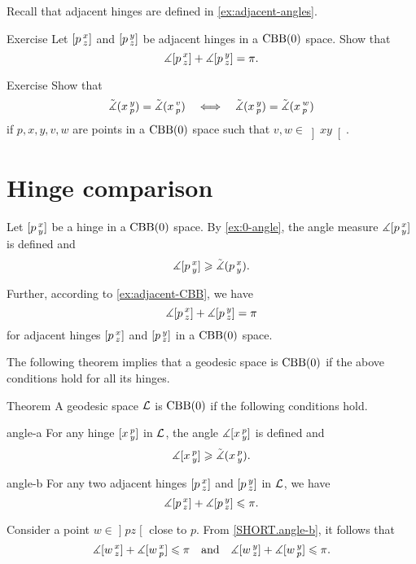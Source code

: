 Recall that adjacent hinges are defined in \ref{ex:adjacent-angles}.

\begin{thm}{Exercise}\label{ex:adjacent-CBB}
Let $[p\,{}^{x}_{z}]$ and $[p\,{}^{y}_{z}]$ be adjacent hinges in a $\mathrm{CBB}(0)$ space.
Show that
\[\measuredangle[p\,{}^{x}_{z}]+\measuredangle[p\,{}^{y}_{z}]= \pi.\]
\end{thm}


\begin{thm}{Exercise}
\label{ex:pxyvw}
Show that  
\[
\tilde\measuredangle(x\,{}^{y}_{p})=\tilde\measuredangle(x\,{}^{v}_{p})
\quad\Longleftrightarrow\quad
\tilde\measuredangle(x\,{}^{y}_{p})=\tilde\measuredangle(x\,{}^{w}_{p})
\]
if 
$p,x,y,v,w$ are points in a $\mathrm{CBB}(0)$ space
such that $v,w\in \left]xy\right[$.
\end{thm}

\section{Hinge comparison}

Let $[p\,{}^{x}_{y}]$ be a hinge in a $\mathrm{CBB}(0)$ space.
By \ref{ex:0-angle}, the angle measure $\measuredangle[p\,{}^{x}_{y}]$ is defined and
\[\measuredangle[p\,{}^{x}_{y}]\geqslant \tilde\measuredangle(p\,{}^{x}_{y}).\]

Further, according to \ref{ex:adjacent-CBB}, we have 
\[\measuredangle[p\,{}^{x}_{z}]+\measuredangle[p\,{}^{y}_{z}]=\pi\]
for adjacent hinges $[p\,{}^{x}_{z}]$ and $[p\,{}^{y}_{z}]$ in a $\mathrm{CBB}(0)$ space.

The following theorem implies that a geodesic space is $\mathrm{CBB}(0)$ if
the above conditions hold for all its hinges.

\begin{thm}{Theorem}\label{thm:angle-cbb}
A geodesic space $\mathcal{L}$ is $\mathrm{CBB}(0)$ if the following conditions hold.

\begin{subthm}{angle-a}
For any hinge $[x\,{}^{p}_{y}]$ in $\mathcal{L}$, the angle 
$\measuredangle[x\,{}^{p}_{y}]$ is defined and 
\[\measuredangle[x\,{}^{p}_{y}]\geqslant\tilde\measuredangle(x\,{}^{p}_{y}).\]
\end{subthm}

\begin{subthm}{angle-b}
For any two adjacent hinges $[p\,{}^{x}_{z}]$ and $[p\,{}^{y}_{z}]$ in $\mathcal{L}$, we have
\[\measuredangle[p\,{}^{x}_{z}]+\measuredangle[p\,{}^{y}_{z}]\leqslant\pi.\]
\end{subthm}

\end{thm}

Consider a point  $w\in \mathopen{]} p z \mathclose{[}$ close to $p$.
From \ref{SHORT.angle-b}, it follows that 
\[\measuredangle[w\,{}^{x}_{z}]+ \measuredangle[w\,{}^{x}_{p}]\leqslant\pi\quad \text{and}\quad \measuredangle[w\,{}^{y}_{z}] + \measuredangle[w\,{}^{y}_{p}]\leqslant\pi.\]

